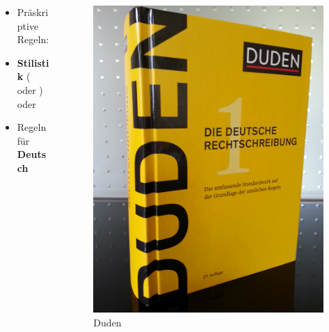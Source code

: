 \begin{frame}

\begin{columns}
\begin{column}{.5\textwidth}

\begin{itemize}
	\item Präskriptive Regeln:
	
	\item[] \textbf{Stilistik} ( oder )\\
	oder\\
	
	\item[] Regeln für  \textbf{Deutsch}
\end{itemize}

\pause 

\end{column}
\begin{column}{.5\textwidth}

\begin{figure}
	\centering
	\includegraphics[scale=.05,angle=-90]{material/Duden27AuflageBerlin2017}
	\caption{Duden}\label{Abb3}
\end{figure}

\end{column}

\end{columns}
	
\end{frame}


